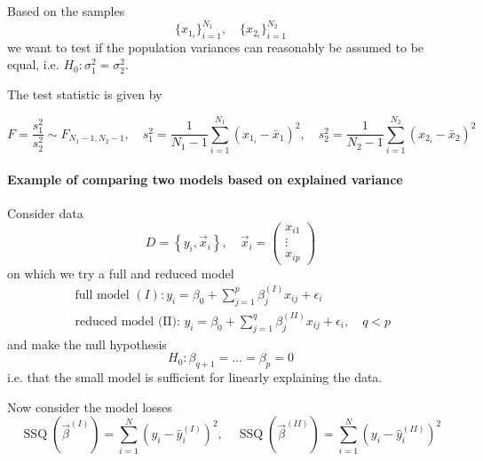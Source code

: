 Based on the samples
\begin{equation}
    \{ x_{1_i} \}_{i=1}^{N_1}, \quad \{ x_{2_i} \}_{i=1}^{N_2}
\end{equation}
we want to test if the population variances 
can reasonably be assumed to be equal, i.e. $H_0: \sigma_1^2 = \sigma_2^2$.

The test statistic is given by

\begin{equation}
    F = \frac{s_1^2}{s_2^2} \sim F_{N_1-1,N_2-1}, \quad s_1^2 = \frac{1}{N_1-1} \sum_{i=1}^{N_1} (x_{1_i} - \bar{x}_1)^2, \quad s_2^2 = \frac{1}{N_2-1} \sum_{i=1}^{N_2} (x_{2_i} - \bar{x}_2)^2
\end{equation}

\paragraph*{Example of comparing two models based on explained variance} Consider data
\begin{equation}
    D=\left\{y_i, \vec{x}_i\right\}, \quad \vec{x}_i=\left(\begin{array}{c}
    x_{i 1} \\
    \vdots \\
    x_{i p}
    \end{array}\right)
\end{equation}
on which we try a full and reduced model
\begin{equation}
    \begin{gathered}
        \text { full model }(I): y_i=\beta_0+\sum_{j=1}^p \beta_j^{(I)} x_{i j}+\epsilon_i \\
        \text { reduced model (II): } y_i=\beta_0+\sum_{j=1}^q \beta_j^{(I I)} x_{i j}+\epsilon_i, \quad q<p
    \end{gathered}
\end{equation}
and make the null hypothesis
\begin{equation}
    H_0: \beta_{q+1} = \dots = \beta_p = 0
\end{equation}
i.e. that the small model is sufficient for linearly explaining the data.

Now consider the model losses
\begin{equation}
    \operatorname{SSQ}(\vec{\beta}^{(I)})=\sum_{i=1}^N\left(y_i-\hat{y}_i^{(I)}\right)^2, \quad \operatorname{SSQ}(\vec{\beta}^{(I I)})=\sum_{i=1}^N\left(y_i-\hat{y}_i^{(I I)}\right)^2
\end{equation}

